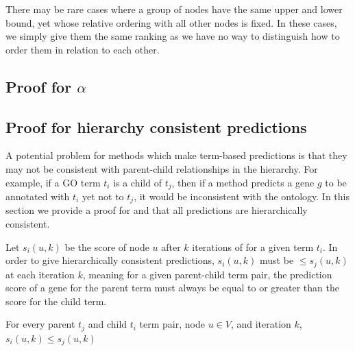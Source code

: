 
There may be rare cases where a group of nodes have the same upper and lower bound, yet whose relative ordering with all other nodes is fixed. In these cases, we simply give them the same ranking as we have no way to distinguish how to order them in relation to each other. 

\subsection{Proof for $\alpha$}
\subsection{Proof for hierarchy consistent predictions}

A potential problem for methods which make term-based predictions is that they may not be consistent with parent-child relationships in the hierarchy. For example, if a GO term $t_i$ is a child of $t_j$, then if a method predicts a gene $g$ to be annotated with $t_i$ yet not to $t_j$, it would be inconsistent with the ontology. 
In this section we provide a proof for \sinksource and \genemania that all predictions are hierarchically consistent.

Let $s_i(u,k)$ be the score of node $u$ after $k$ iterations of \sinksource for a given term $t_i$. 
In order to give hierarchically consistent predictions, $s_i(u,k)$ must be $\leq s_j(u,k)$ at each iteration $k$, meaning for a given parent-child term pair, the prediction score of a gene for the parent term must always be equal to or greater than the score for the child term.

\begin{theorem}
For every parent $t_j$ and child $t_i$ term pair, node $u \in V$, and iteration $k$, $s_i(u,k) \leq s_j(u,k)$
\end{theorem}

